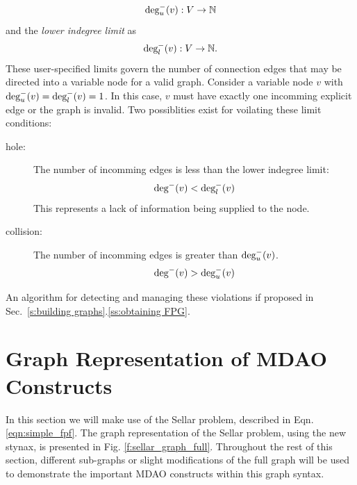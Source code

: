 	\begin{equation}
	\textrm{deg}_u^-(v):V \to \mathbb{N}
	\end{equation} 
	and the \emph{lower indegree limit} as
	\begin{equation}
	\textrm{deg}_l^-(v):V \to \mathbb{N}.
	\end{equation}
	These user-specified limits govern the number of connection edges that may be directed into a variable
	node for a valid graph. Consider a variable node $v$ with
	$\textrm{deg}_u^-(v) = \textrm{deg}_l^-(v) = 1$. In this case, $v$ must have exactly one
	incomming explicit edge or the graph is invalid. Two possiblities exist for voilating 
	these limit conditions: 
	\begin{description}
	  \item[hole: ] The number of incomming edges is less than the lower indegree limit:
		\begin{equation} \textrm{deg}^-(v) < \textrm{deg}_l^-(v) \label{e:hole} \end{equation}
		This represents a lack of information being supplied to the node.

  \item[collision: ] The number of incomming edges is greater than $ \textrm{deg}_u^-(v)$. 
    \begin{equation} \textrm{deg}^-(v) > \textrm{deg}_u^-(v) \label{e:collision}\end{equation}
\end{description} 
	An algorithm for detecting and managing these violations if proposed in Sec.~\ref{s:building graphs}.\ref{ss:obtaining FPG}.

\section{Graph Representation of MDAO Constructs}
\label{s:graph representation}
In this section we will make use of the Sellar problem, described in 
Eqn. \ref{eqn:simple_fpf}. The graph representation of the Sellar problem, 
using the new stynax, is presented in Fig. \ref{f:sellar_graph_full}. Throughout
the rest of this section, different sub-graphs or slight modifications of 
the full graph will be used to demonstrate the important MDAO constructs within
this graph syntax.

